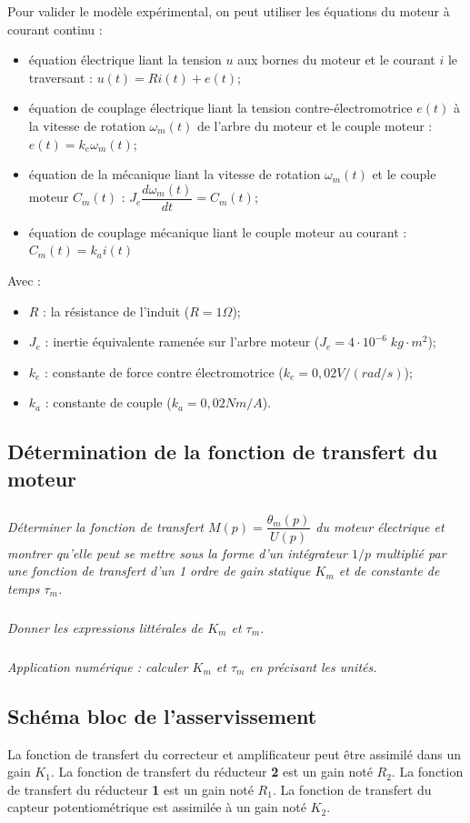 \documentclass[11pt,oneside]{article}
\begin{document}
Pour valider le modèle expérimental, on peut utiliser les équations du moteur à courant continu :
\begin{itemize}
\item équation électrique liant la tension $u$ aux bornes du moteur et le courant $i$ le traversant :
$u(t) = Ri(t) + e(t)$;
\item équation de couplage électrique liant la tension contre-électromotrice $e(t)$ à la vitesse de
rotation $\omega_m(t)$ de l’arbre du moteur et le couple moteur : $e(t)= k_e \omega_m(t)$;
\item équation de la mécanique liant la vitesse de rotation $\omega_m(t)$  et le couple moteur $C_m(t)$ :
$J_e \dfrac{d\omega_m(t)}{dt} = C_m(t)$;
\item équation de couplage mécanique liant le couple moteur au courant : $C_m(t)=k_ai(t)$
\end{itemize}

Avec :
\begin{itemize}
\item $R$ : la résistance de l'induit  ($R=1\Omega$);
\item $J_e$ : inertie équivalente ramenée sur l’arbre moteur ($J_e=4\cdot10^{-6} \;  kg\cdot m^2$);
\item $k_e$ : constante de force contre électromotrice ($k_e=0,02V/(rad/s)$);
\item $k_a$ : constante de couple ($k_a=0,02 Nm/A$).
\end{itemize}

\subsection{Détermination de la fonction de transfert du moteur}
\subparagraph{}
\textit{Déterminer la fonction de transfert $M(p)=\dfrac{\theta_m(p)}{U(p)}$ du moteur électrique et montrer qu'elle peut se mettre sous la forme d'un intégrateur $1/p$ multiplié par une fonction de transfert d'un 1 ordre de gain statique $K_m$ et de constante de temps $\tau_m$.}

\subparagraph{}
\textit{Donner les expressions littérales de $K_m$ et $\tau_m$.}

\subparagraph{}
\textit{Application numérique : calculer $K_m$ et $\tau_m$ en précisant les unités.}


\subsection{Schéma bloc de l'asservissement}
La fonction de transfert du correcteur et amplificateur peut être assimilé dans un gain $K_1$. La fonction de transfert du réducteur \textbf{2} est un gain noté $R_2$. La fonction de transfert du réducteur \textbf{1} est un gain noté $R_1$. La fonction de transfert du capteur potentiométrique est assimilée à un gain noté $K_2$.
\end{document}
